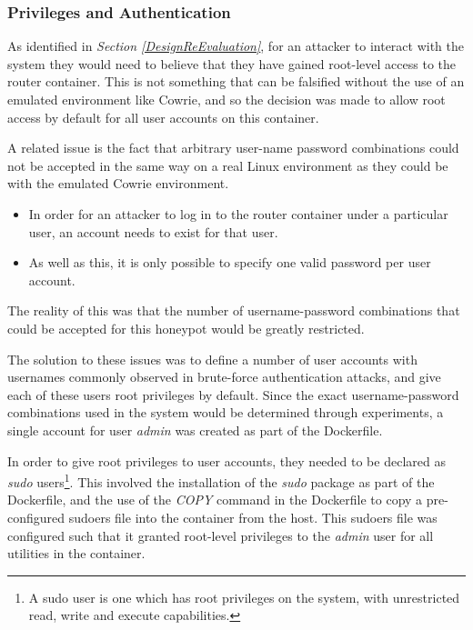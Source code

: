 
\subsubsection{Privileges and Authentication}
As identified in \textit{Section \ref{DesignReEvaluation}}, for an attacker to interact with the system they would need to believe that they have gained root-level access to the router container. This is not something that can be falsified without the use of an emulated environment like Cowrie, and so the decision was made to allow root access by default for all user accounts on this container. 

A related issue is the fact that arbitrary user-name password combinations could not be accepted in the same way on a real Linux environment as they could be with the emulated Cowrie environment. 
\begin{itemize}
\item In  order for an attacker to log in to the router container under a particular user, an account needs to exist for that user.
\item  As well as this, it is only possible to specify one valid password per user account.
\end{itemize} 
The reality of this was that the number of username-password combinations that could be accepted for this honeypot would be greatly restricted. 

The solution to these issues was to define a number of user accounts with usernames commonly observed in brute-force authentication attacks, and give each of these users root privileges by default. Since the exact username-password combinations used in the system would be determined through experiments, a single account for user \textit{admin} was created as part of the Dockerfile. 

In order to give root privileges to user accounts, they needed to be declared as \textit{sudo} users\footnote{A sudo user is one which has root privileges on the system, with unrestricted read, write and execute capabilities.}. This involved the installation of the \textit{sudo} package as part of the Dockerfile, and the use of the \textit{COPY} command in the Dockerfile to copy a pre-configured sudoers file into the container from the host. This sudoers file was configured such that it granted root-level privileges to the \textit{admin} user for all utilities in the container.



